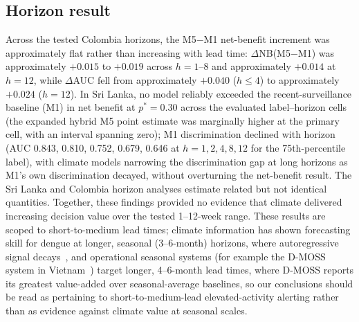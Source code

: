 \documentclass[11pt,a4paper]{article}
\begin{document}
\subsection{Horizon result}
Across the tested Colombia horizons, the M5$-$M1 net-benefit increment was approximately flat rather than increasing with lead time: $\Delta$NB(M5$-$M1) was approximately $+0.015$ to $+0.019$ across $h=1$--8 and approximately $+0.014$ at $h=12$, while $\Delta$AUC fell from approximately $+0.040$ ($h\le4$) to approximately $+0.024$ ($h=12$). In Sri Lanka, no model reliably exceeded the recent-surveillance baseline (M1) in net benefit at $p^*=0.30$ across the evaluated label--horizon cells (the expanded hybrid M5 point estimate was marginally higher at the primary cell, with an interval spanning zero); M1 discrimination declined with horizon (AUC 0.843, 0.810, 0.752, 0.679, 0.646 at $h=1,2,4,8,12$ for the 75th-percentile label), with climate models narrowing the discrimination gap at long horizons as M1's own discrimination decayed, without overturning the net-benefit result. The Sri Lanka and Colombia horizon analyses estimate related but not identical quantities. Together, these findings provided no evidence that climate delivered increasing decision value over the tested 1--12-week range. These results are scoped to short-to-medium lead times; climate information has shown forecasting skill for dengue at longer, seasonal (3--6-month) horizons, where autoregressive signal decays~\cite{Beal2025,ColonGonzalez2021}, and operational seasonal systems (for example the D-MOSS system in Vietnam~\cite{Campbell2026}) target longer, 4--6-month lead times, where D-MOSS reports its greatest value-added over seasonal-average baselines, so our conclusions should be read as pertaining to short-to-medium-lead elevated-activity alerting rather than as evidence against climate value at seasonal scales.
\end{document}
